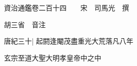 






























































資治通鑑卷二百十四　　宋　司馬光　撰

胡三省　音注

唐紀三十|{
	起閼逢閹茂盡重光大荒落凡八年}


玄宗至道大聖大明孝皇帝中之中

